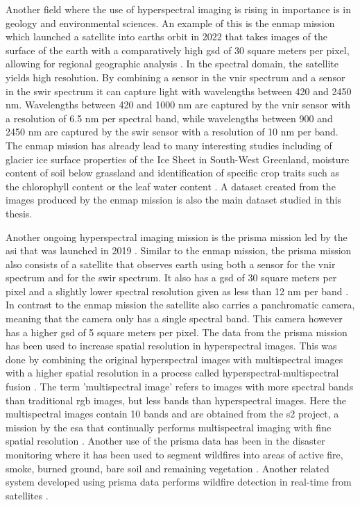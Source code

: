 Another field where the use of hyperspectral imaging is rising in importance is in geology and environmental sciences. An example of this is the \ac{enmap} mission which launched a satellite into earths orbit in 2022 that takes images of the surface of the earth with a comparatively high \ac{gsd} of 30 square meters per pixel, allowing for regional geographic analysis \citep{guanter_enmap_2015}. In the spectral domain, the satellite yields high resolution. By combining a sensor in the \ac{vnir} spectrum and a sensor in the \ac{swir} spectrum it can capture light with wavelengths between 420 and 2450 nm. Wavelengths between 420 and 1000 nm are captured by the \ac{vnir} sensor with a resolution of 6.5 nm per spectral band, while wavelengths between 900 and 2450 nm are captured by the \ac{swir} sensor with a resolution of 10 nm per band.
The \ac{enmap} mission has already lead to many interesting studies including of glacier ice surface properties of the Ice Sheet in South-West Greenland, moisture content of soil below grassland and identification of specific crop traits such as the chlorophyll content or the leaf water content \citep{bohn_glacier_2022,pascual-venteo_prototyping_2022,dopper_estimating_2022}.
A dataset created from the images produced by the \ac{enmap} mission is also the main dataset studied in this thesis.

Another ongoing hyperspectral imaging mission is the \ac{prisma} mission led by the \ac{asi} that was launched in 2019 \citep{loizzo_prisma_2019}. Similar to the \ac{enmap} mission, the \ac{prisma} mission also consists of a satellite that observes earth using both a sensor for the \ac{vnir} spectrum and for the \ac{swir} spectrum. It also has a \ac{gsd} of 30 square meters per pixel and a slightly lower spectral resolution given as less than 12 nm per band \citep{guarini_overview_2017,guarini_prisma_2018}. In contrast to the \ac{enmap} mission the satellite also carries a panchromatic camera, meaning that the camera only has a single spectral band. This camera however has a higher \ac{gsd} of 5 square meters per pixel. The data from the \ac{prisma} mission has been used to increase spatial resolution in hyperspectral images. This was done by combining the original hyperspectral images with multispectral images with a higher spatial resolution in a process called hyperspectral-multispectral fusion \citep{acito_prisma_2022}. The term 'multispectral image' refers to images with more spectral bands than traditional \ac{rgb} images, but less bands than hyperspectral images. Here the multispectral images contain 10 bands and are obtained from the \ac{s2} project, a mission by the \ac{esa} that continually performs multispectral imaging with fine spatial resolution \citep{drusch_sentinel-2_2012}. Another use of the \ac{prisma} data has been in the disaster monitoring where it has been used to segment wildfires into areas of active fire, smoke, burned ground, bare soil and remaining vegetation \citep{spiller_transfer_2022}. Another related system developed using \ac{prisma} data performs wildfire detection in real-time from satellites  \citep{spiller_wildfire_2022}.


